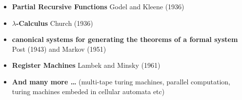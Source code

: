 \begin{itemize}
	\item \textbf{Partial Recursive Functions} Godel and Kleene (1936)
	\item \textbf{$\lambda$-Calculus} Church (1936)
	\item \textbf{canonical systems for generating the theorems of a formal system} Post (1943) and Markov (1951)
	\item \textbf{Register Machines} Lambek and Minsky (1961)
	\item \textbf{And many more \dots} (multi-tape turing machines, parallel computation, turing machines embeded in cellular automata etc)
\end{itemize}
